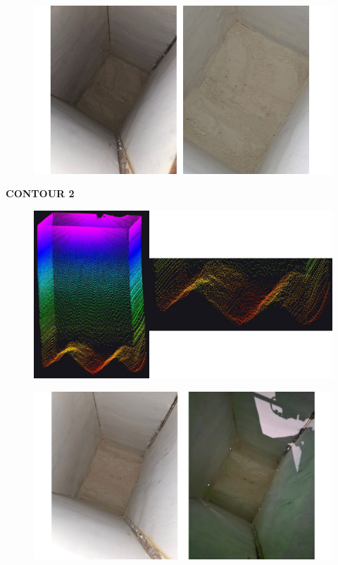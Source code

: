 \vspace{0.5cm}

\begin{figure}[H]
	\centering
	\includegraphics[width=1\textwidth]{Figures/test3-1-actual}
\end{figure}

\newpage

\textbf{CONTOUR 2}

\begin{figure}[H]
	\centering
	\includegraphics[width=1\textwidth]{Figures/test3-2}
\end{figure}

\vspace{0.5cm}

\begin{figure}[H]
	\centering
	\includegraphics[width=1\textwidth]{Figures/test3-2-actual}
\end{figure}

